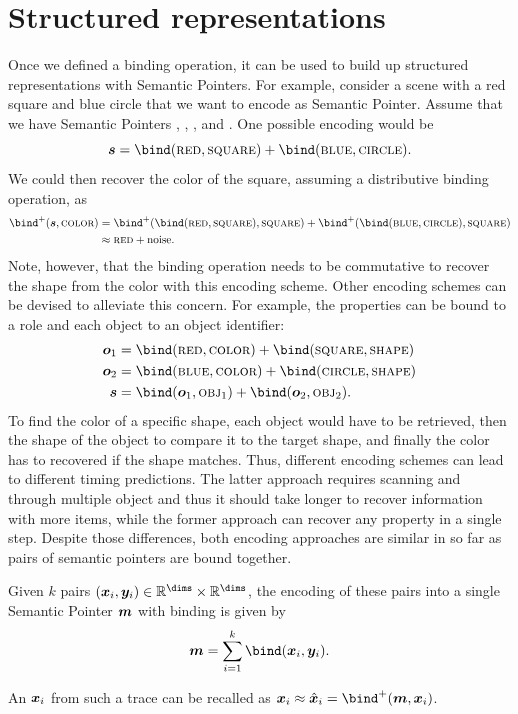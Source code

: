 \section{Structured representations}
Once we defined a binding operation, it can be used to build up structured representations with Semantic Pointers.
For example, consider a scene with a red square and blue circle that we want to encode as Semantic Pointer.
Assume that we have Semantic Pointers , , , and .
One possible encoding would be
\begin{equation}
    \vc s = \bind(\spc{red}, \spc{square}) + \bind(\spc{blue}, \spc{circle}) \text{.}
\end{equation}
We could then recover the color of the square, assuming a distributive binding operation, as
\begin{align}
    \bind^+(\vc s, \spc{color}) &= \bind^+(\bind(\spc{red}, \spc{square}), \spc{square}) + \bind^+(\bind(\spc{blue}, \spc{circle}), \spc{square}) \\
    &\approx \spc{red} + \mathrm{noise} \text{.}
\end{align}
Note, however, that the binding operation needs to be commutative to recover the shape from the color with this encoding scheme.
Other encoding schemes can be devised to alleviate this concern.
For example, the properties can be bound to a role and each object to an object identifier:
\begin{align}
    \vc o_1 &= \bind(\spc{red}, \spc{color}) + \bind(\spc{square}, \spc{shape}) \\
    \vc o_2 &= \bind(\spc{blue}, \spc{color}) + \bind(\spc{circle}, \spc{shape}) \\
    \vc s &= \bind(\vc o_1, \spc{obj}_1) + \bind(\vc o_2, \spc{obj}_2) \text{.}
\end{align}
To find the color of a specific shape, each object would have to be retrieved, then the shape of the object to compare it to the target shape, and finally the color has to recovered if the shape matches.
Thus, different encoding schemes can lead to different timing predictions.
The latter approach requires scanning and through multiple object and thus it should take longer to recover information with more items, while the former approach can recover any property in a single step.
Despite those differences, both encoding approaches are similar in so far as pairs of semantic pointers are bound together.
\begin{defn}
    Given $k$ pairs $(\vc x_i, \vc y_i) \in \mathbb{R}^{\dims} \times \mathbb{R}^{\dims}$, the encoding of these pairs into a single Semantic Pointer $\bm{m}$ with binding is given by
    \begin{equation}
        \vc m = \sum_{i=1}^k \bind(\vc x_i, \vc y_i) \text{.}
    \end{equation}
\end{defn}
An $\bm{x}_i$ from such a trace can be recalled as $\vc x_i \approx \hat{\vc x}_i = \bind^+(\vc m, \vc x_i)$.

